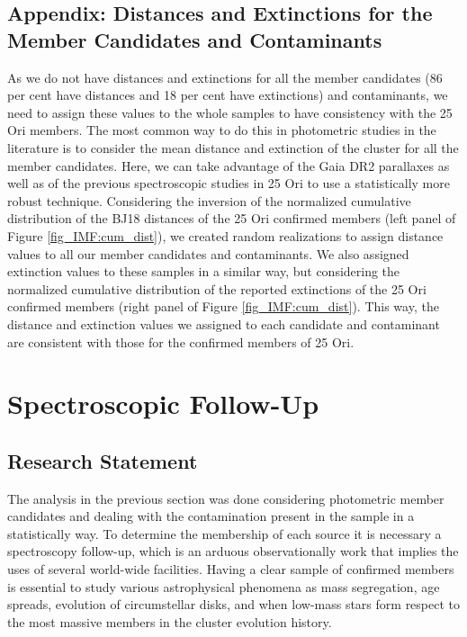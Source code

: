 \documentclass[12pt]{article}
\begin{document}
\subsection{Appendix: Distances and Extinctions for the Member Candidates and Contaminants}
\label{sec_app_IMF:distance_extinction}
As we do not have distances and extinctions for all the member candidates (86 per cent have distances and 18 per cent have extinctions) and contaminants, we need to assign these values to the whole samples to have consistency with the 25 Ori members. The most common way to do this in photometric studies in the literature is to consider the mean distance and extinction of the cluster for all the member candidates. Here, we can take advantage of the Gaia DR2 parallaxes as well as of the previous spectroscopic studies in 25 Ori to use a statistically more robust technique. Considering the inversion of the normalized cumulative distribution of the BJ18 distances of the 25 Ori confirmed members (left panel of Figure \ref{fig_IMF:cum_dist}), we created random realizations to assign distance values to all our member candidates and contaminants. We also assigned extinction values to these samples in a similar way, but considering the normalized cumulative distribution of the reported extinctions of the 25 Ori confirmed members (right panel of Figure \ref{fig_IMF:cum_dist}). This way, the distance and extinction values we assigned to each candidate and contaminant are consistent with those for the confirmed members of 25 Ori.


\section{Spectroscopic Follow-Up}
\label{sec:spectroscopy}

\subsection{Research Statement}
\label{sec:rs_spectroscopy}
The analysis in the previous section was done considering photometric member candidates and dealing with the contamination present in the sample in a statistically way. To determine the membership of each source it is necessary a spectroscopy follow-up, which is an arduous observationally work that implies the uses of several world-wide facilities. Having a clear sample of confirmed members is essential to study various astrophysical phenomena as mass segregation, age spreads, evolution of circumstellar disks, and when low-mass stars form respect to the most massive members in the cluster evolution history. 
\end{document}
